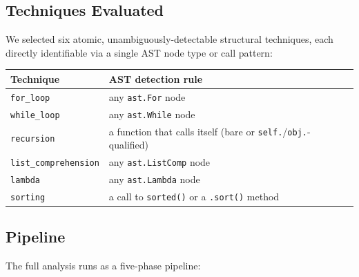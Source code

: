 \documentclass{article}
\begin{document}
\subsection{Techniques Evaluated}

We selected six atomic, unambiguously-detectable structural techniques, each
directly identifiable via a single AST node type or call pattern:

\begin{center}
\begin{tabular}{lp{8cm}}
\toprule
\textbf{Technique} & \textbf{AST detection rule} \\
\midrule
\texttt{for\_loop} & any \texttt{ast.For} node \\
\texttt{while\_loop} & any \texttt{ast.While} node \\
\texttt{recursion} & a function that calls itself (bare or \texttt{self.}/\texttt{obj.}-qualified) \\
\texttt{list\_comprehension} & any \texttt{ast.ListComp} node \\
\texttt{lambda} & any \texttt{ast.Lambda} node \\
\texttt{sorting} & a call to \texttt{sorted()} or a \texttt{.sort()} method \\
\bottomrule
\end{tabular}
\end{center}

\subsection{Pipeline}

The full analysis runs as a five-phase pipeline:
\end{document}
